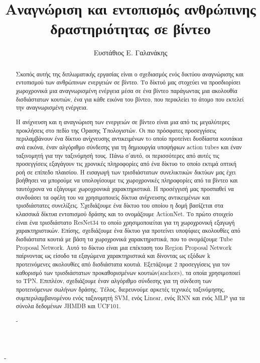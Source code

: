 \documentclass[10pt, twoside, a4paper]{cvsp-thesis}
\title{Αναγνώριση και εντοπισμός ανθρώπινης δραστηριότητας σε βίντεο}
\author{Ευστάθιος Ε. Γαλανάκης}
\newcommand{\tl}{\textlatin}
\newcommand{\gr}{\selectlanguage{greek}}
\begin{document}
\gr
\maketitle

\begin{acknowledgements}
-
\end{acknowledgements}

\begin{abstract}
  
Σκοπός αυτής της διπλωματικής εργασίας είναι ο σχεδιασμός ενός δικτύου αναγνώρισης
και εντοπισμού των ανθρώπινων ενεργειών σε βίντεο. Το δίκτυό μας στοχεύει να προσδιορίσει χωροχρονικά
μια αναγνωρισμένη ενέργεια μέσα σε ένα βίντεο παράγωντας μια ακολουθία δισδιάστατων  κουτιών,
ένα για κάθε εικόνα του βίντεο, που περικλείει το άτομο που εκτελεί την αναγνωρισμένη ενέργεια. \par

Η ανίχνευση και η αναγνώριση των ενεργειών σε βίντεο είναι μια από τις μεγαλύτερες προκλήσεις
στο πεδίο της Όρασης Υπολογιστών. Οι πιο πρόσφατες προσεγγίσεις περιλαμβάνουν ένα δίκτυο ανίχνευσης αντικειμένων
τo οποίο προτείνει δυσδίαστα κουτάκια ανά εικόνα, έναν αλγόριθμο σύνδεσης για τη δημιουργία
υποψήφιων  \tl{action tubes} και έναν ταξινομητή για την ταξινόμησή τους. Πάνω σ'αυτό, οι  περισσότερες
από αυτές τις προσεγγίσεις εξαγάγουν τις χρονικές πληροφορίες από ένα δίκτυο το οποίο εκτιμά
οπτική ροή σε επίπεδο πλαισίου. Η εισαγωγή των τρισδιάστατων συνελικτικών δικτύων 
μας έχει βοήθησει να μπορούμε να υπολογίσουμε τις χωροχρονικές πληροφορίες από τα βίντεο και
ταυτόχρονα να εξάγουμε χωροχρονικά χαρακτηριστικά. Η προσέγγισή μας προσπαθεί να συνδυάσει τα οφέλη
του να χρησιμοποιείς δίκτυα ανίχνευσης αντικειμένων και τρισδιάστατες συνελίξεις.
Σχεδιάζουμε ένα δίκτυο του οποίου η δομή βασίζεται στα κλασσικά δίκτυα  εντοπισμού  δράσης
 και το ονομάζουμε \tl{ActionNet}. Το πρώτο στοιχείο είναι ένα τρισδιάστατο \tl{ ResNet34}   το οποίο
χρησιμοποιείται για τη χωροχρονική εξαγωγή χαρακτηριστικών. Επίσης, σχεδιάζουμε ένα δίκτυο για
προτείνει υποψίφιες ακολουθίες από δισδιάστατα κουτιά με βάση τα χωροχρονικά χαρακτηριστικά, που το ονομάζουμε
 \tl{Tube Proposal Network}. Αυτό το δίκτυο είναι μια επέκταση του \tl{Region Proposal Network } παίρνοντας ως είσοδο
τα εξαγώμενα χαρακτηριστικά και δίνοντας ως εξόδων \tl{k} προτεινόμενες ακολουθίες από δισδιάστατα κουτιά. Εξετάζουμε
2 προσεγγίσεις για τον καθορισμό των τρισδιάστατων προκαθορισμένων κουτιών(\tl{anchors}), τα  οποία χρησιμοποιεί το \tl{ TPN}. Επιπλέον, σχεδιάζουμε
έναν αλγόριθμο σύνδεσης για τη σύνδεση των προτεινόμενων σωλήνων δράσης. Τέλος, διερευνούμε 
αρκετές τεχνικές ταξινόμησης, συμπεριλαμβανομένου ενός ταξινομητή \tl{ SVM}, ενός \tl{Linear}, ενός \tl{ RNN}  και ενός \tl{ MLP}  για τα σύνολα δεδομένων
 \tl{JHMDB } και \tl{UCF101}.
\begin{keywords}
  -
\end{keywords}
\end{abstract}
\end{document}
